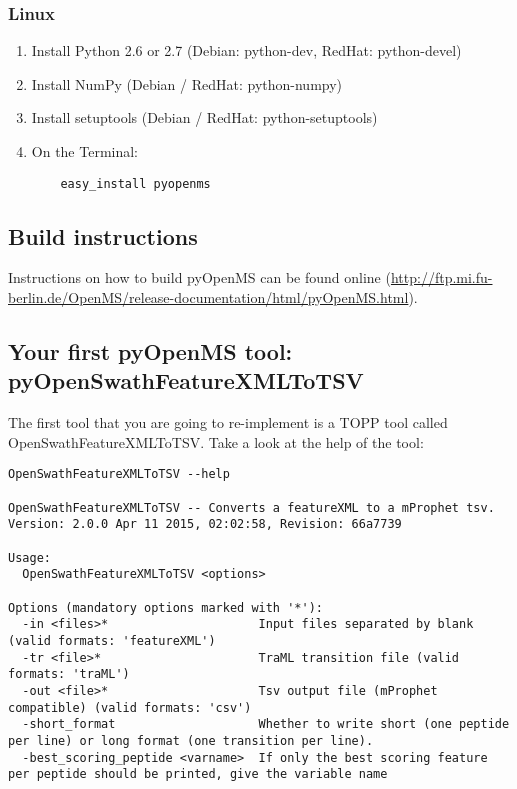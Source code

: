 {\subsubsection{Linux}
\begin{enumerate}
  \item Install Python 2.6 or 2.7 (Debian: python-dev, RedHat: python-devel)
  \item Install NumPy (Debian / RedHat: python-numpy)
  \item Install setuptools (Debian / RedHat: python-setuptools)
  \item On the Terminal:
    \begin{lstlisting}
    easy_install pyopenms
    \end{lstlisting}
\end{enumerate}

\subsection{Build instructions}
Instructions on how to build pyOpenMS can be found online (\url{http://ftp.mi.fu-berlin.de/OpenMS/release-documentation/html/pyOpenMS.html}).

\subsection{Your first pyOpenMS tool: pyOpenSwathFeatureXMLToTSV}
The first tool that you are going to re-implement is a TOPP tool called OpenSwathFeatureXMLToTSV. Take a look at the help of the tool:

\begin{lstlisting}
OpenSwathFeatureXMLToTSV --help

OpenSwathFeatureXMLToTSV -- Converts a featureXML to a mProphet tsv.
Version: 2.0.0 Apr 11 2015, 02:02:58, Revision: 66a7739

Usage:
  OpenSwathFeatureXMLToTSV <options>

Options (mandatory options marked with '*'):
  -in <files>*                     Input files separated by blank (valid formats: 'featureXML')
  -tr <file>*                      TraML transition file (valid formats: 'traML')
  -out <file>*                     Tsv output file (mProphet compatible) (valid formats: 'csv')
  -short_format                    Whether to write short (one peptide per line) or long format (one transition per line).
  -best_scoring_peptide <varname>  If only the best scoring feature per peptide should be printed, give the variable name
                                   

\end{lstlisting}}
